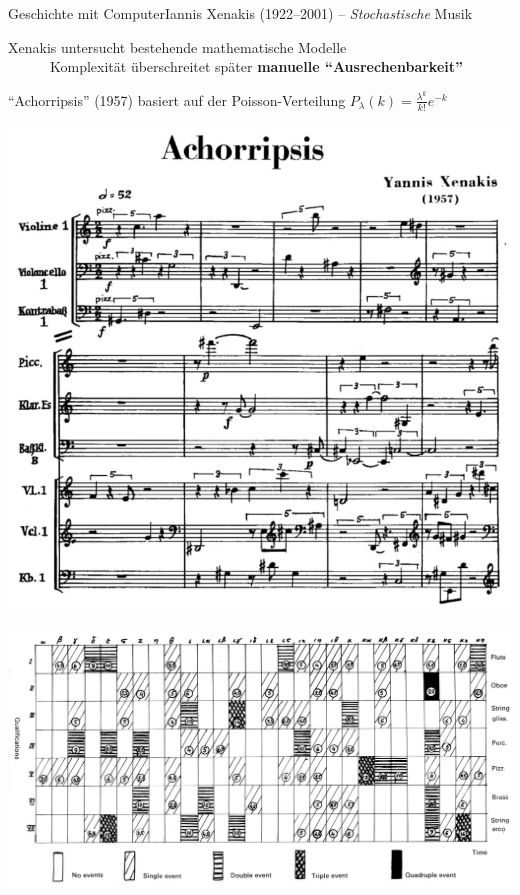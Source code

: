 \begin{frame}{Geschichte mit Computer}{Iannis Xenakis (1922--2001) -- \emph{Stochastische} Musik}
	
	Xenakis untersucht bestehende mathematische Modelle\\
	~~~~~\conclude~Komplexität überschreitet später \textbf{manuelle \enquote{Ausrechenbarkeit}}\\
	\medskip
	
	\enquote{Achorripsis} (1957) basiert auf der Poisson-Verteilung $P_\lambda(k) = \frac{\lambda^k}{k!}e^{-k}$
	
	\includegraphics[width=.33\textwidth]{img/Achorripsis_Noten.png}
	~~\includegraphics[width=.6\textwidth]{img/Achorripsis_CellMatrix_from_FormalizedMusic.png}
	
	
\end{frame}


